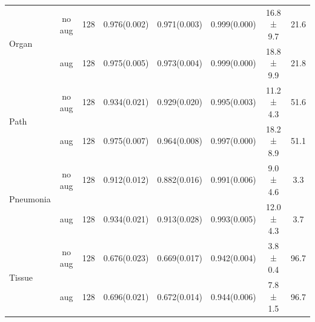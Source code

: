 \begin{table}[htb]
\begin{tabular}{l*{7}{c}}
          \multirow{2}{*}{Organ} & no aug & 128 & 0.976(0.002) & 0.971(0.003) & 0.999(0.000) & 16.8 ± 9.7 & \num{21.6} \\
           & aug & 128 & 0.975(0.005) & 0.973(0.004) & 0.999(0.000) & 18.8 ± 9.9 & \num{21.8} \\[8pt]
          \multirow{2}{*}{Path} & no aug & 128 & 0.934(0.021) & 0.929(0.020) & 0.995(0.003) & 11.2 ± 4.3 & \num{51.6} \\
           & aug & 128 & 0.975(0.007) & 0.964(0.008) & 0.997(0.000) & 18.2 ± 8.9 & \num{51.1} \\[8pt]
          \multirow{2}{*}{Pneumonia} & no aug & 128 & 0.912(0.012) & 0.882(0.016) & 0.991(0.006) & 9.0 ± 4.6 & \num{3.3} \\
           & aug & 128 & 0.934(0.021) & 0.913(0.028) & 0.993(0.005) & 12.0 ± 4.3 & \num{3.7} \\[8pt]
          \multirow{2}{*}{Tissue} & no aug & 128 & 0.676(0.023) & 0.669(0.017) & 0.942(0.004) & 3.8 ± 0.4 & \num{96.7} \\
           & aug & 128 & 0.696(0.021) & 0.672(0.014) & 0.944(0.006) & 7.8 ± 1.5 & \num{96.7} \\[8pt]
          \bottomrule
     \end{tabular}
\end{table}